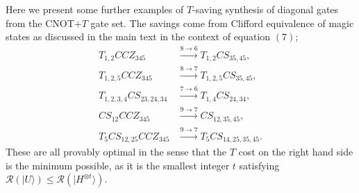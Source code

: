 \documentclass[aps,prl,twocolumn,showpacs,superscriptaddress,groupedaddress,amsmath,amssymb]{revtex4-1}  %
\def\ket #1{\vert #1\rangle}
\begin{document}
Here we present some further examples of $T$-saving synthesis of diagonal gates from the CNOT$+T$ gate set. The savings come from Clifford equivalence of magic states as discussed in the main text in the context of equation $(7)$;
\begin{align}
T_{1,2}CCZ_{345}  &\overset{8 \rightarrow 6}{\longrightarrow}T_{1,2}CS_{35,45}, \\
T_{1,2,5}CCZ_{345}  &\overset{8 \rightarrow 7}{\longrightarrow}T_{1,2,5}CS_{35,45} ,\\
T_{1,2,3,4}CS_{23,24,34}  &\overset{7 \rightarrow 6}{\longrightarrow} T_{1,4}CS_{24,34}, \\
CS_{12}CCZ_{345} &\overset{9 \rightarrow 7}{\longrightarrow}CS_{12,35,45},\\
T_{5}CS_{12,25}CCZ_{345} &\overset{9 \rightarrow 7}{\longrightarrow}T_{5}CS_{14,25,35,45}.
\end{align}
These are all provably optimal in the sense that the $T$ cost on the right hand side is the minimum possible, as it is the smallest integer $t$ satisfying $\mathcal{R}(\ket{U}) \leq \mathcal{R}(\ket{H^{\otimes t}}) $.
\end{document}
